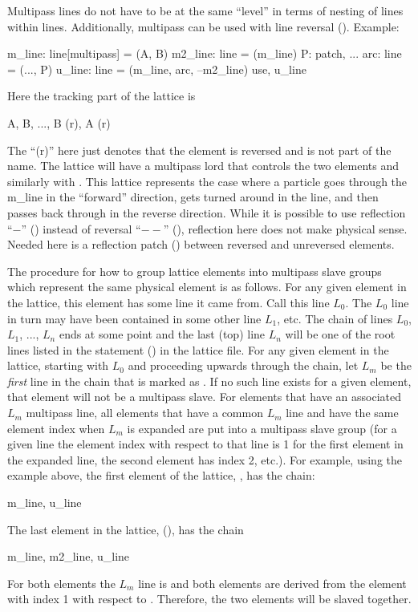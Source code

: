 Multipass lines do not have to be at the same ``level'' in terms of nesting of lines within
lines. Additionally, multipass can be used with line reversal (). Example:
\begin{example}
  m_line: line[multipass] = (A, B)
  m2_line: line = (m_line)
  P: patch, ...
  arc: line = (..., P)
  u_line: line = (m_line, arc, --m2_line)
  use, u_line
\end{example}
Here the tracking part of the lattice is
\begin{example}
  A, B, ..., B (r), A (r)
\end{example}
The ``(r)'' here just denotes that the element is reversed and is not part of the name. The lattice
will have a multipass lord  that controls the two  elements and similarly with
. This lattice represents the case where a particle goes through the m_line in the ``forward''
direction, gets turned around in the  line, and then passes back through  in the
reverse direction.  While it is possible to use reflection ``$-$'' () instead
of reversal ``$--$'' (), reflection here does not make physical sense.  Needed
here is a reflection patch  () between reversed and unreversed elements.

The procedure for how to group lattice elements into multipass slave groups which represent the same
physical element is as follows. For any given element in the lattice, this element has some line it
came from. Call this line $L_0$. The $L_0$ line in turn may have been contained in some other line
$L_1$, etc. The chain of lines $L_0$, $L_1$, ..., $L_n$ ends at some point and the last (top) line
$L_n$ will be one of the root lines listed in the  statement () in the lattice
file. For any given element in the lattice, starting with $L_0$ and proceeding upwards through the
chain, let $L_m$ be the {\em first} line in the chain that is marked as . If no such
line exists for a given element, that element will not be a multipass slave. For elements that have
an associated $L_m$ multipass line, all elements that have a common $L_m$ line and have the same
element index when $L_m$ is expanded are put into a multipass slave group (for a given line the
element index with respect to that line is 1 for the first element in the expanded line, the second
element has index 2, etc.).  For example, using the example above, the first element of the lattice,
, has the chain:
\begin{example}
    m_line, u_line
\end{example} 
The last element in the lattice, (), has the chain
\begin{example}
  m_line, m2_line, u_line
\end{example}
For both elements the $L_m$ line is  and both elements are derived from the element with
index 1 with respect to . Therefore, the two elements will be slaved together.

